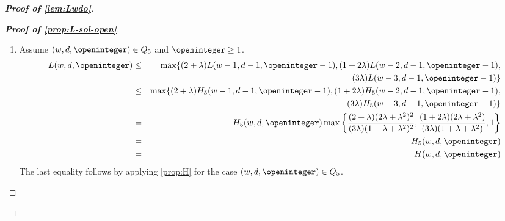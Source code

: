 \begin{proof}[\textbf{Proof of \cref{lem:Lwdo}}]
\begin{proof}[\textbf{Proof of \cref{prop:L-sol-open}}]
\begin{enumerate}[label=\textbf{Case \arabic*:}, itemindent=*, leftmargin=0em]
\item Assume $(w, d, \openinteger)\in Q_5$ and $\openinteger \ge 1$.
\begin{eqnarray*}
L(w, d, \openinteger) & \leq & \max\{(2+\lambda)L(w-1, d-1, \openinteger-1), (1+2\lambda)L(w-2, d-1, \openinteger-1), \\
& & (3\lambda)L(w-3, d-1, \openinteger-1)\}\\
& \le & \max\{(2+\lambda)H_5(w-1, d-1, \openinteger-1), (1+2\lambda)H_5(w-2, d-1, \openinteger-1), \\
& & (3\lambda)H_5(w-3, d-1, \openinteger-1)\}\\
& = & H_5(w, d, \openinteger)\max\left\{\frac{(2+\lambda)(2\lambda+\lambda^2)^2}{(3\lambda)(1+\lambda+\lambda^2)^2},
                             \frac{(1+2\lambda)(2\lambda+\lambda^2)}{(3\lambda)(1+\lambda+\lambda^2)}, 1 \right\}\\
& = & H_5(w, d, \openinteger)\\
& = & H(w, d, \openinteger)
\end{eqnarray*}
The last equality follows by applying \cref{prop:H} for the case $(w, d,\openinteger)\in Q_5$.

\end{enumerate}

\end{proof}

\end{proof}




























